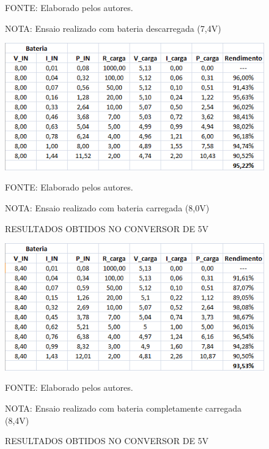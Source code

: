 \documentclass[
	12pt,				%
	openright,			%
	oneside,			%
	a4paper,			%
	english,			%
	french,				%
	spanish,			%
	brazil,				%
	oldfontcommands
	]{abntex2}
\begin{document}
\begin{apendicesenv}
\begin{figure}[th]
		\begin{small}
			FONTE: Elaborado pelos autores.
		\end{small}	
		
		\begin{footnotesize}
		NOTA: Ensaio realizado com bateria descarregada (7,4V)
		\end{footnotesize}
	\end{figure}
	
	\begin{figure}[th]
		\caption{RESULTADOS OBTIDOS NO CONVERSOR DE 5V}
		\centering
		\includegraphics[width=0.75\linewidth]{./anexos/rend5_2}
		
		\begin{small}
			FONTE: Elaborado pelos autores.
		\end{small}	
		
		\begin{footnotesize}
		NOTA: Ensaio realizado com bateria carregada (8,0V)
		\end{footnotesize}
	\end{figure}
	
	\begin{figure}[th]
		\caption{RESULTADOS OBTIDOS NO CONVERSOR DE 5V}
		\centering
		\includegraphics[width=0.75\linewidth]{./anexos/rend5_3}
		
		\begin{small}
			FONTE: Elaborado pelos autores.
		\end{small}	
		
		\begin{footnotesize}
		NOTA: Ensaio realizado com bateria completamente carregada (8,4V)
		\end{footnotesize}
	\end{figure}
	

\end{apendicesenv}
\end{document}
